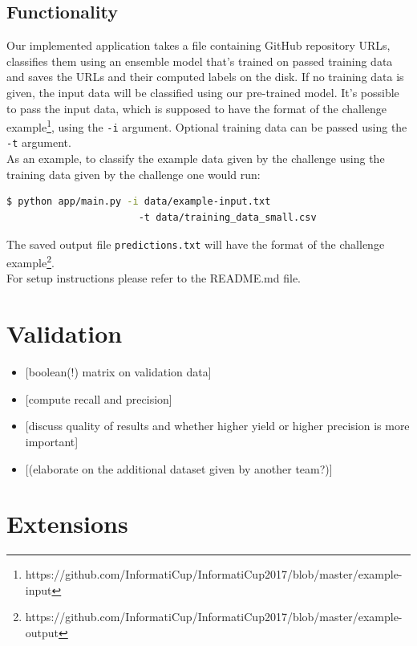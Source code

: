\documentclass[%
a4paper,
DIV12,
2.5headlines,
bigheadings,
titlepage,
openbib,
]{scrartcl}
\begin{document}
\subsection{Functionality}\label{functionality}

Our implemented application takes a file containing GitHub repository URLs, classifies them using an ensemble model that's trained on passed training data and saves the URLs and their computed labels on the disk.
If no training data is given, the input data will be classified using our pre-trained model.
It's possible to pass the input data, which is supposed to have the format of the challenge example\footnote{https://github.com/InformatiCup/InformatiCup2017/blob/master/example-input}, using the \texttt{-i} argument.
Optional training data can be passed using the \texttt{-t} argument.\\
As an example, to classify the example data given by the challenge using the training data given by the challenge one would run:

\begin{lstlisting}[language=bash]
  $ python app/main.py -i data/example-input.txt
                       -t data/training_data_small.csv
\end{lstlisting}

The saved output file \texttt{predictions.txt} will have the format of the challenge example\footnote{https://github.com/InformatiCup/InformatiCup2017/blob/master/example-output}.\\
For setup instructions please refer to the README.md file.

\section{Validation}\label{validation}

\begin{itemize}
\tightlist
\item
  {[}boolean(!) matrix on validation data{]}
\item
  {[}compute recall and precision{]}
\item
  {[}discuss quality of results and whether higher yield or higher
  precision is more important{]}
\item
  {[}(elaborate on the additional dataset given by another team?){]}
\end{itemize}

\section{Extensions}\label{extensions}
\end{document}
